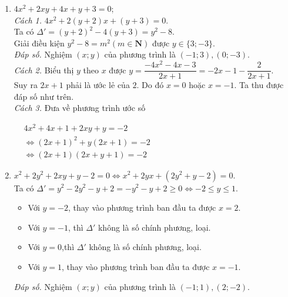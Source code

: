 \begin{bt}
{\begin{enumerate}
    Ta có bảng giá trị
      \begin{center}
    \setlength{\tabcolsep}{18pt}
    \begin{tabular}{| c | c| c |c|c|c|c|c| c|}
                 \hline 
                 $x-2$ & $1$   &  $-1$ & $5$ & $-5$  \\ 
                  \hline 
                 $x+y-1$ & $5$   &  $-5$ & $1$   &  $-1$ \\
                  \hline 
                   $x$&$3$&$1$&$7$&$-3$\\
                  \hline
                  $y$&$3$&$-5$&$-5$&$3$\\
                  \hline
                 \end{tabular}            
    \end{center}
    \textit{Đáp số.} Nghiệm $(x;y)$ của phương trình là $(3;3), (1;-5), (7;-5), (-3;3)$.
    \item $4x^2+2xy+4x+y+3=0$;\\
   \textit{Cách 1.} $4x^2+2(y+2)x+(y+3)=0$.\\
   Ta có $\Delta'=(y+2)^2-4(y+3)=y^2-8$.\\
   Giải điều kiện $y^2-8=m^2 (m \in \mathbf{N})$ được $y \in \{3;-3\}$.\\
   \textit{Đáp số.} Nghiệm $(x;y)$ của phương trình là $ (-1;3), (0;-3)$.\\
   \textit{Cách 2.} Biểu thị $y$ theo $x$ được $y=\dfrac{-4x^2-4x-3}{2x+1}=-2x-1-\dfrac{2}{2x+1}$.\\
   Suy ra $2x+1$ phải là ước lẻ của $2$. Do đó $x=0$ hoặc $x=-1$. Ta thu được đáp số như trên.\\
   \textit{Cách 3.} Đưa về phương trình ước số
   
 $  \begin{aligned}
   &4x^2+4x+1+2xy+y=-2\\
  & \Leftrightarrow (2x+1)^2+y(2x+1)=-2\\
   &\Leftrightarrow (2x+1)(2x+y+1)=-2
   \end{aligned}$
    \item $x^2+2y^2+2xy+y-2=0 \Leftrightarrow x^2+2yx+(2y^2+y-2)=0$.\\
    Ta có $\Delta'=y^2-2y^2-y+2=-y^2-y+2 \geq 0 \Leftrightarrow -2\leq y \leq 1$.
    \begin{itemize}
    \item Với $y=-2$, thay vào phương trình ban đầu ta được $x=2$.
    \item Với $y=-1$, thì $\Delta'$ không là số chính phương, loại.
    \item Với $y=0$,thì $\Delta'$ không là số chính phương, loại.
    \item Với $y=1$, thay vào phương trình ban đầu ta được $x=-1$.
    \end{itemize}
   \textit{Đáp số.} Nghiệm $(x;y)$ của phương trình là $ (-1;1), (2;-2)$.\\ 
    \end{enumerate}    
    }
\end{bt}
